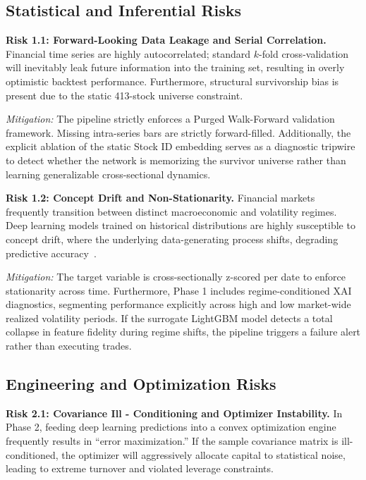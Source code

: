 \subsection*{Statistical and Inferential Risks}

\textbf{Risk 1.1: Forward-Looking Data Leakage and Serial Correlation.} Financial time series are highly autocorrelated; standard $k$-fold cross-validation will inevitably leak future information into the training set, resulting in overly optimistic backtest performance. Furthermore, structural survivorship bias is present due to the static 413-stock universe constraint.

\medskip

\textit{Mitigation:} The pipeline strictly enforces a Purged Walk-Forward validation framework. Missing intra-series bars are strictly forward-filled. Additionally, the explicit ablation of the static Stock ID embedding serves as a diagnostic tripwire to detect whether the network is memorizing the survivor universe rather than learning generalizable cross-sectional dynamics.

\bigskip

\textbf{Risk 1.2: Concept Drift and Non-Stationarity.} Financial markets frequently transition between distinct macroeconomic and volatility regimes. Deep learning models trained on historical distributions are highly susceptible to concept drift, where the underlying data-generating process shifts, degrading predictive accuracy~\cite{Dixon2020}.

\medskip

\textit{Mitigation:} The target variable is cross-sectionally z-scored per date to enforce stationarity across time. Furthermore, Phase 1 includes regime-conditioned \acs{XAI} diagnostics, segmenting performance explicitly across high and low market-wide realized volatility periods. If the surrogate LightGBM model detects a total collapse in feature fidelity during regime shifts, the pipeline triggers a failure alert rather than executing trades.

\subsection*{Engineering and Optimization Risks}

\textbf{Risk 2.1: Covariance Ill - Conditioning and Optimizer Instability.} In Phase 2, feeding deep learning predictions into a convex optimization engine frequently results in ``error maximization.'' If the sample covariance matrix is ill-conditioned, the optimizer will aggressively allocate capital to statistical noise, leading to extreme turnover and violated leverage constraints.


